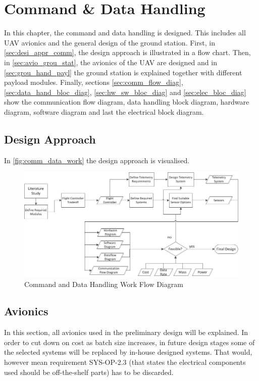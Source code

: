 \chapter{Command \& Data Handling}%
\setlength{\parindent}{15pt}
\label{ch:avio_grou_hand} %

In this chapter, the command and data handling is designed. This includes all UAV avionics and the general design of the ground station. First, in \autoref{sec:desi_appr_comm}, the design approach is illustrated in a flow chart. Then, in \autoref{sec:avio_grou_stat}, the avionics of the UAV are designed and in \autoref{sec:grou_hand_payl} the ground station is explained together with different payload modules. Finally, sections \ref{sec:comm_flow_diag}, \ref{sec:data_hand_bloc_diag}, \ref{sec:hw_sw_bloc_diag} and \ref{sec:elec_bloc_diag} show the communication flow diagram, data handling block diagram, hardware diagram, software diagram and last the electrical block diagram.
 
\section{Design Approach}
\label{sec:desi_appr_comm}
In \autoref{fig:comm_data_work} the design approach is visualised. 

\begin{figure}[htb]
    \centering
    \includegraphics[width=\textwidth]{./CommandDataHandling/Figures/WorkFlow}
    \caption{Command and Data Handling Work Flow Diagram}
    \label{fig:comm_data_work}
\end{figure}



\section{Avionics}%
\label{sec:avio_grou_stat}
In this section, all avionics used in the preliminary design will be explained. In order to cut down on cost as batch size increases, in future design stages some of the selected systems will be replaced by in-house designed systems. That would, however mean requirement SYS-OP-2.3 (that states the electrical components used should be off-the-shelf parts) has to be discarded.  

